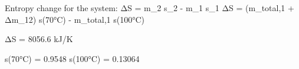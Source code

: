 Entropy change for the system:  
ΔS = m_2 s_2 - m_1 s_1  
ΔS = (m_total,1 + Δm_12) s(70°C) - m_total,1 s(100°C)  

ΔS = 8056.6 kJ/K  

s(70°C) = 0.9548  
s(100°C) = 0.13064